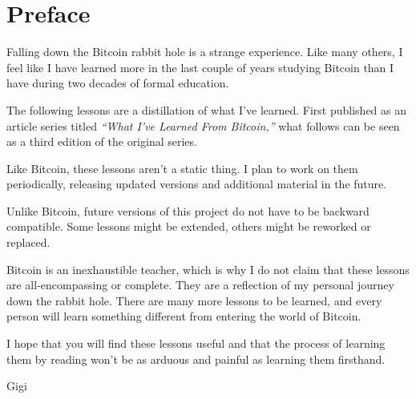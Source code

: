 \chapter*{Preface}

Falling down the Bitcoin rabbit hole is a strange experience. Like many others,
I feel like I have learned more in the last couple of years studying Bitcoin
than I have during two decades of formal education.

The following lessons are a distillation of what I’ve learned. First published
as an article series titled \textit{“What I’ve Learned From Bitcoin,”} what follows
can be seen as a third edition of the original series.

Like Bitcoin, these lessons aren't a static thing. I plan to work on them
periodically, releasing updated versions and additional material in the future.

Unlike Bitcoin, future versions of this project do not have to be backward
compatible. Some lessons might be extended, others might be reworked or
replaced.

Bitcoin is an inexhaustible teacher, which is why I do not claim that these
lessons are all-encompassing or complete. They are a reflection of my personal
journey down the rabbit hole. There are many more lessons to be learned, and
every person will learn something different from entering the world of Bitcoin.

I hope that you will find these lessons useful and that the process of learning
them by reading won’t be as arduous and painful as learning them firsthand.

Gigi

%
%
